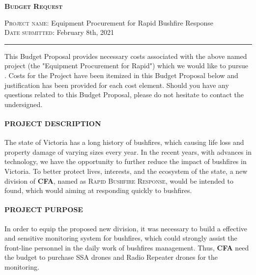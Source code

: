 \documentclass[13pt]{ctexart} %
\begin{document}
\newpage
\setmainfont[
    BoldFont       = texgyrepagella-bold.otf ,
    ItalicFont     = texgyrepagella-italic.otf ,
    BoldItalicFont = texgyrepagella-bolditalic.otf ]{texgyrepagella-regular.otf}
\thispagestyle{empty}
\begin{center}%
    \fontsize{20pt}{14pt} %
    \selectfont
    \textsc{\textbf{Budget Request}}
\end{center}
\vspace{10pt}
\noindent \textsc{Project name}: Equipment Procurement for Rapid Bushfire Response
\\ \noindent \textsc{Date submitted}: February 8th, 2021
\hrule\vspace{10pt}
\begin{flushleft}
    \fontsize{12pt}{10pt} %
    \selectfont
    \indent This Budget Proposal provides necessary costs associated with the above named project (the "Equipment Procurement for Rapid") which we would like to pursue . Costs for the Project have been itemized in this Budget Proposal below and justification has been provided for each cost element. Should you have any questions related to this Budget Proposal, please do not hesitate to contact the undersigned.
\end{flushleft}
\paragraph{PROJECT DESCRIPTION\\ } The state of Victoria has a long history of bushfires, which causing life loss and property damage of varying sizes every year. In the recent years, with advances in technology, we have the opportunity to further reduce the impact of bushfires in Victoria. To better protect lives, interests, and the ecosystem of the state, a new division of \textbf{CFA}, named as \textsc{Rapid Bushfire Response}, would be intended to found, which would aiming at responding quickly to bushfires.

\paragraph{PROJECT PURPOSE\\ } In order to equip the proposed new division, it was necessary to build a effective and sensitive monitoring system for bushfires, which could strongly assist the front-line personnel in the daily work of bushfires management. Thus, \textbf{CFA} need the budget to purchase SSA drones and Radio Repeater drones for the monitoring.
\end{document}
